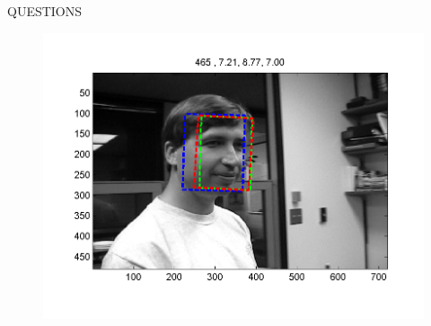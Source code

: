 \begin{frame}
\frametitle{}
\logoCSIPCPL\mypagenum
		QUESTIONS
\begin{figure}
\includegraphics[width=1.0\textwidth]{thesis/00465.png}
\end{figure}

\end{frame}



